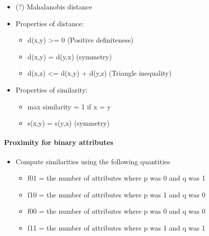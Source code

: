 \documentclass[11pt]{article}
\providecommand{\tightlist}{%
      \setlength{\itemsep}{0pt}\setlength{\parskip}{0pt}}
\begin{document}
    \begin{itemize}
\tightlist
\item
  (?) Mahalanobis distance
\end{itemize}

    \begin{itemize}
\tightlist
\item
  Properties of distance:

  \begin{itemize}
  \tightlist
  \item
    d(x,y) \textgreater{}= 0 (Positive definiteness)
  \item
    d(x,y) = d(y,x) (symmetry)
  \item
    d(x,z) \textless{}= d(x,y) + d(y,z) (Triangle inequality)
  \end{itemize}
\end{itemize}

    \begin{itemize}
\tightlist
\item
  Properties of similarity:

  \begin{itemize}
  \tightlist
  \item
    max similarity = 1 if x = y
  \item
    s(x,y) = s(y,x) (symmetry)
  \end{itemize}
\end{itemize}

    \paragraph{Proximity for binary
attributes}\label{proximity-for-binary-attributes}

    \begin{itemize}
\tightlist
\item
  Compute similarities using the following quantities

  \begin{itemize}
  \tightlist
  \item
    f01 = the number of attributes where p was 0 and q was 1
  \item
    f10 = the number of attributes where p was 1 and q was 0
  \item
    f00 = the number of attributes where p was 0 and q was 0
  \item
    f11 = the number of attributes where p was 1 and q was 1
  \end{itemize}
\end{itemize}
\end{document}
